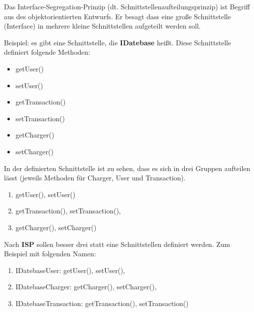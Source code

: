 Das Interface-Segregation-Prinzip (dt. Schnittstellenaufteilungsprinzip) 
ist Begriff aus des objektorientierten Entwurfs. Er besagt dass eine große Schnittstelle (Interface) 
in mehrere kleine Schnittstellen aufgeteilt werden soll.

Beispiel: es gibt eine Schnittstelle, die \textbf{IDatebase} heißt. 
Diese Schnittstelle definiert folgende Methoden:
\begin{itemize}
    \item getUser()
    \item setUser()
    \item getTransaction()
    \item setTransaction()
    \item getCharger()
    \item setCharger()
\end{itemize}

In der definierten Schnittstelle ist zu sehen, 
dass es sich in drei Gruppen aufteilen lässt (jeweils Methoden für Charger, User und Transaction).
\begin{enumerate}
    \item getUser(), setUser()
    \item getTransaction(), setTransaction(),
    \item getCharger(), setCharger()
\end{enumerate}

Nach \textbf{ISP} sollen besser drei statt eine Schnittstellen definiert werden.
Zum Beispiel mit folgenden Namen:
\begin{enumerate}
    \item IDatebaseUser: getUser(), setUser(),
    \item IDatebaseCharger: getCharger(), setCharger(),
    \item IDatebaseTransaction: getTransaction(), setTransaction()
\end{enumerate}